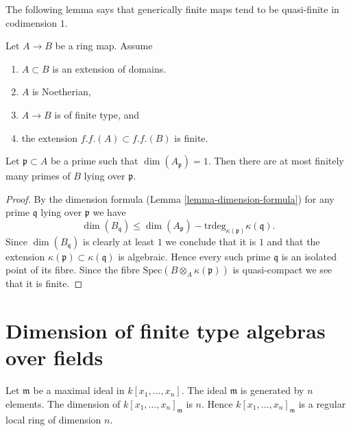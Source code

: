 \noindent
The following lemma says that generically finite maps
tend to be quasi-finite in codimension $1$.

\begin{lemma}
\label{lemma-finite-in-codim-1}
Let $A \to B$ be a ring map.
Assume
\begin{enumerate}
\item $A \subset B$ is an extension of domains.
\item $A$ is Noetherian,
\item $A \to B$ is of finite type, and
\item the extension $f.f.(A) \subset f.f.(B)$ is finite.
\end{enumerate}
Let $\mathfrak p \subset A$ be a prime such that $\dim(A_\mathfrak p) = 1$.
Then there are at most finitely many primes of $B$ lying over $\mathfrak p$.
\end{lemma}

\begin{proof}
By the dimension formula (Lemma \ref{lemma-dimension-formula})
for any prime $\mathfrak q$ lying over $\mathfrak p$ we have
$$
\dim(B_{\mathfrak q}) \leq
\dim(A_{\mathfrak p}) - \text{trdeg}_{\kappa(\mathfrak p)} \kappa(\mathfrak q).
$$
Since $\dim(B_{\mathfrak q})$ is clearly at least $1$ we conclude that
it is $1$ and that the extension
$\kappa(\mathfrak p) \subset \kappa(\mathfrak q)$ is algebraic.
Hence every such prime $\mathfrak q$ is an isolated point of its fibre.
Since the fibre $\text{Spec}(B \otimes_A \kappa(\mathfrak p))$
is quasi-compact we see that it is finite.
\end{proof}









\section{Dimension of finite type algebras over fields}
\label{section-dimension-finite-type-algebras}

\begin{lemma}
\label{lemma-dim-affine-space}
Let $\mathfrak m$ be a maximal ideal in $k[x_1, \ldots, x_n]$.
The ideal $\mathfrak m$ is generated by $n$ elements.
The dimension of $k[x_1, \ldots, x_n]_{\mathfrak m}$ is $n$.
Hence $k[x_1, \ldots, x_n]_{\mathfrak m}$ is a regular local
ring of dimension $n$.
\end{lemma}

